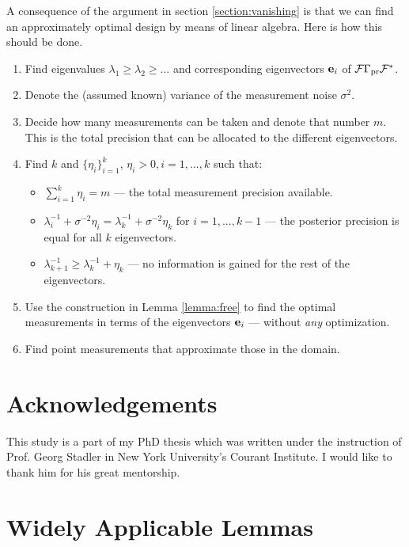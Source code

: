 \documentclass{amsart}
\numberwithin{equation}{section}
\begin{document}
A consequence of the argument in section \ref{section:vanishing} is
that we can find an approximately optimal design by means of linear
algebra. Here is how this should be done.
\begin{enumerate}

   \item Find eigenvalues $\lambda_1 \geq \lambda_2 \geq ...$ and
     corresponding eigenvectors $\mathbf{e}_i$ of $\mathcal{F} \Gamma_{\textup{pr}} \mathcal{F}^*$.
   \item Denote the (assumed known) variance of the measurement noise
     $\sigma^2$.
   \item Decide how many measurements can be taken and denote that
     number $m$. This is the total precision that can be allocated to
     the different eigenvectors.
    \item Find $k$ and $\{\eta_i\}_{i=1}^k$, $\eta_i > 0, i=1,...,k$
      such that:
      \begin{itemize}
        \item $\sum_{i=1}^k \eta_i = m$ --- the total measurement precision available.
      \item $\lambda_i^{-1} + \sigma^{-2}\eta_i = \lambda_k^{-1} +
        \sigma^{-2}\eta_k$ for $i=1,...,k-1$ --- the posterior
        precision is equal for all $k$ eigenvectors.
      \item $\lambda_{k+1}^{-1} \geq \lambda_k^{-1} + \eta_k$ --- no
        information is gained for the rest of the eigenvectors.
      \end{itemize}
      \item Use the construction in Lemma \ref{lemma:free} to find the
        optimal measurements in terms of the eigenvectors $\mathbf{e}_i$ ---
        without \emph{any} optimization.
      \item Find point measurements that approximate those in the domain. 
\end{enumerate}

\section{Acknowledgements}
This study is a part of my PhD thesis \cite{mine} which was written
under the instruction of Prof. Georg Stadler in New York University's
Courant Institute. I would like to thank him for his great mentorship.

\appendix
\section{Widely Applicable Lemmas}
\end{document}
